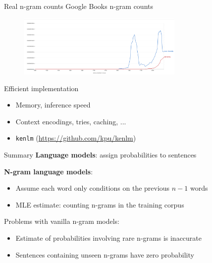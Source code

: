 \documentclass[usenames,dvipsnames,notes]{beamer}
\begin{document}
\begin{frame}
    {Real n-gram counts}
    Google Books n-gram counts
    \begin{figure}
        \includegraphics[height=3cm]{figures/google-ngram}
    \end{figure}

    Efficient implementation\\
    \begin{itemize}
        \item Memory, inference speed
        \item Context encodings, tries, caching, ...
        \item \texttt{kenlm} (\url{https://github.com/kpu/kenlm})
    \end{itemize}
\end{frame}

\begin{frame}
    {Summary}
    \textbf{Language models}: assign probabilities to sentences

    \textbf{N-gram language models}:\\
    \begin{itemize}
        \item Assume each word only conditions on the previous $n-1$ words
        \item MLE estimate: counting n-grams in the training corpus
    \end{itemize}

    Problems with vanilla n-gram models:\\
    \begin{itemize}
        \item Estimate of probabilities involving rare n-grams is inaccurate
        \item Sentences containing unseen n-grams have zero probability
    \end{itemize}
\end{frame}
\end{document}
